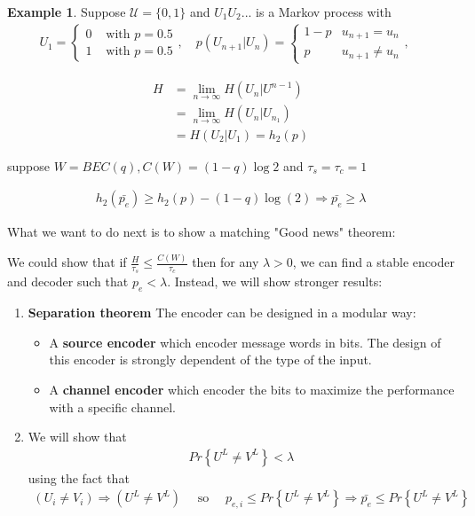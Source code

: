 \documentclass[twoside]{article}
\theoremstyle{definition} %
\newtheorem{example}{Example}
\renewcommand{\Pr}[1]{Pr\left\{#1\right\}}
\def\U{\mathcal{U}}
\begin{document}
\begin{example}
  Suppose $\U = \{ 0, 1 \}$ and $U_1 U_2 ...$ is a Markov process with
    \begin{align*}
    U_1 =
    \left\{
    \begin{array}{ll}
      0 & \text{ with } p = 0.5 \\
      1 & \text{ with } p = 0.5
    \end{array}
    \right. , \quad
    p(U_{n+1} | U_n) =
    \left\{
    \begin{array}{ll}
      1 - p & u_{n+1} = u_n \\
      p     & u_{n+1} \neq u_n
    \end{array}
    \right. , \quad
  \end{align*}
\end{example}

\begin{align*}
  H &= \lim_{n \to \infty} H(U_n | U^{n-1})\\
    &= \lim_{n \to \infty} H(U_n | U_{n_1})\\
    &= H(U_2 | U_1) = h_2(p)
\end{align*}

suppose $W = BEC(q), C(W) = (1 - q)\log 2$ and $\tau_s = \tau_c = 1$

\begin{align*}
  h_2(\bar{p_e}) \geq h_2(p) - (1 - q)\log(2) \Rightarrow \bar{p_e} \geq \lambda
\end{align*}

What we want to do next is to show a matching "Good news" theorem:

We could show that if $\frac{H}{\tau_s} \leq \frac{C(W)}{\tau_c}$ then for any $\lambda > 0$, we can find a stable encoder and decoder such that $p_e < \lambda$.
Instead, we will show stronger results:
\begin{enumerate}
  \item \textbf{Separation theorem}
    The encoder can be designed in a modular way:
    \begin{itemize}
      \item A \textbf{source encoder} which encoder message words in bits. The design of this encoder is strongly dependent of the type of the input.
      \item A \textbf{channel encoder} which encoder the bits to maximize the performance with a specific channel.
    \end{itemize}
  \item We will show that
  \begin{align*}
    \Pr{U^L \neq V^L} < \lambda
  \end{align*}
  using the fact that
  \begin{align*}
    (U_i \neq V_i) \Rightarrow (U^L \neq V^L)
    \quad \text{ so } \quad
    p_{e,i} \leq \Pr{U^L \neq V^L} \Rightarrow \bar{p_e} \leq \Pr{U^L \neq V^L}
  \end{align*}
\end{enumerate}
\end{document}
